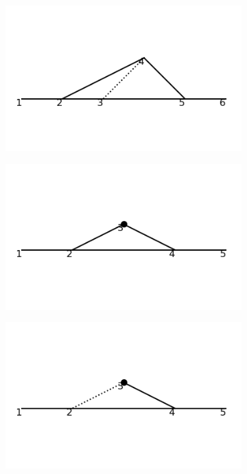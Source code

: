 \documentclass[11pt,a4paper,twoside,pdf]{article}
\numberwithin{equation}{section}
\begin{document}
\begin{figure}[h!]
\begin{subfigure}[t]{0.19\textwidth}
        \caption{ }
    \end{subfigure}
    \begin{subfigure}[t]{0.19\textwidth}
        \centering
        \includegraphics[width=\textwidth]{plots/order4_1to1/7.png}
        \caption{ }
    \end{subfigure}
    \begin{subfigure}[t]{0.19\textwidth}
        \centering
        \includegraphics[width=\textwidth]{plots/order4_1to1/counterterms/1.png}
        \caption{ }
    \end{subfigure}
    \begin{subfigure}[t]{0.19\textwidth}
        \centering
        \includegraphics[width=\textwidth]{plots/order4_1to1/counterterms/3.png}
        \caption{ }
        

\end{subfigure}
\end{figure}
\end{document}
